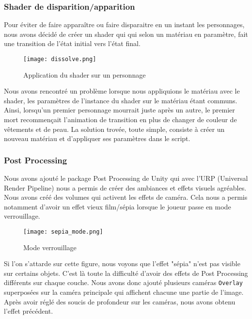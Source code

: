 \subsubsection{Shader de disparition/apparition}
Pour éviter de faire apparaître ou faire disparaitre en un instant les personnages, nous avons décidé de créer un shader qui qui selon un matériau en paramètre, 
fait une transition de l'état initial vers l'état final. 
\begin{figure}[hbt!]
    \centering
    \texttt{[image: dissolve.png]}
    \caption{Application du shader sur un personnage}

\end{figure}
\FloatBarrier

Nous avons rencontré un problème lorsque nous appliquions le matériau avec le shader,
les paramètres de l'instance du shader sur le matériau étant communs. Ainsi, lorsqu'un premier personnage mourrait juste après un autre, 
le premier mort recommençait l'animation de transition en plus de changer de couleur de vêtements et de peau.
La solution trovée, toute simple, consiste à créer un nouveau matériau et d'appliquer  ses paramètres dans le script.



\subsubsection{Post Processing}

Nous avons ajouté le package Post Processing de Unity qui avec l'URP (Universal Render Pipeline)
nous a permis de créer des ambiances et effets visuels agréables.
Nous avons créé des volumes qui activent les effets de caméra.
Cela nous a permis notamment d'avoir un effet vieux film/sépia lorsque le joueur passe en mode verrouillage.

\begin{figure}[hbt!]
    \centering
    \texttt{[image: sepia\_mode.png]}
    \caption{Mode verrouillage}
\end{figure}
\FloatBarrier


Si l'on s'attarde sur cette figure, nous voyons que l'effet "sépia" n'est pas visible sur certains objets.
C'est là toute la difficulté d'avoir des effets de Post Processing différents sur chaque couche.
Nous avons donc ajouté plusieurs caméras \texttt{Overlay} superposées sur la caméra principale qui affichent chacune une partie de l'image.
Après avoir réglé des soucis de profondeur sur les caméras, nous avons obtenu l'effet précédent.